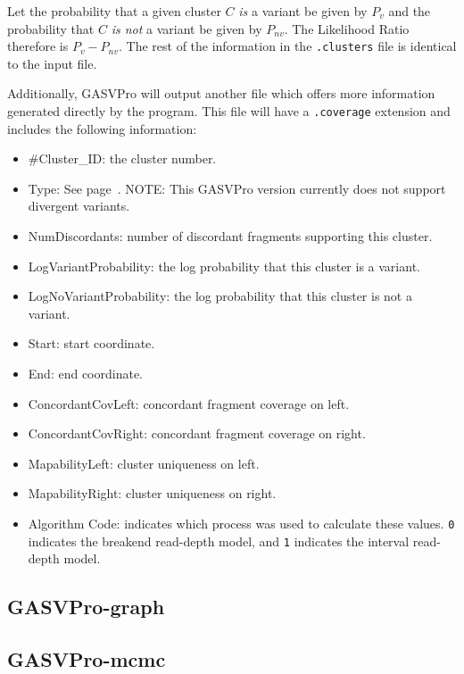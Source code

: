 \documentclass[11pt]{article}
\begin{document}
\noindent Let the probability that a given cluster $C$ {\em is} a variant be given by $P_v$ and the probability that $C$ {\em is not} a variant be given by $P_{nv}$.  The Likelihood Ratio therefore is $P_v - P_{nv}$. The rest of the information in the \verb+.clusters+ file is identical to the input file. \label{LRexp}

Additionally, GASVPro will output another file which offers more information generated directly by the program. This file will have a \verb+.coverage+ extension and includes the following information:
\begin{framed}
\begin{itemize}
	\item[] \#Cluster\_ID: {\small the cluster number.}
	\item[] Type: {\small See page~\pageref{structvartypes}}. {\scriptsize NOTE: This GASVPro version currently does not support divergent variants.}
	\item[] NumDiscordants: {\small number of discordant fragments supporting this cluster.}
	\item[] LogVariantProbability: {\small the log probability that this cluster is a variant.}
	\item[] LogNoVariantProbability: {\small the log probability that this cluster is not a variant.}
	\item[] Start: {\small start coordinate.}
	\item[] End: {\small end coordinate.}
	\item[] ConcordantCovLeft: {\small concordant fragment coverage on left.}
	\item[] ConcordantCovRight: {\small concordant fragment coverage on right.}
	\item[] MapabilityLeft: {\small cluster uniqueness on left.}
	\item[] MapabilityRight: {\small cluster uniqueness on right.}
	\item[] Algorithm Code: {\small indicates which process was used to calculate these values. \verb+0+ indicates the breakend read-depth model, and \verb+1+ indicates the interval read-depth model.}
	\end{itemize}
\end{framed}

\subsection{GASVPro-graph}

\subsection{GASVPro-mcmc}
\end{document}

